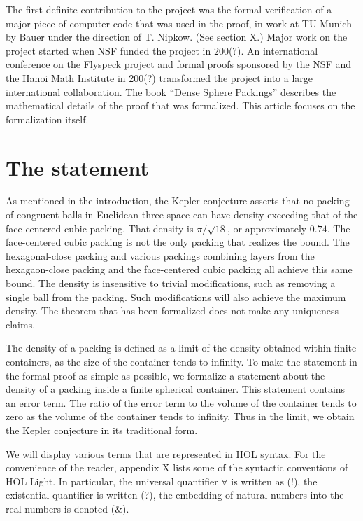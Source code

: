 The first  definite contribution to the project was the formal verification of a major piece of
computer code that was used in the proof, in work at TU Munich by Bauer under the direction of T. Nipkow. (See section X.)
Major work on the project started when NSF funded
the project in 200(?).   An international conference on the Flyspeck project and formal proofs sponsored by the NSF and the
Hanoi Math Institute in 200(?) transformed the project into a large international collaboration.
The book ``Dense Sphere Packings'' describes the mathematical details of the proof that was formalized.  This article
focuses on the formalization itself.



\section{The statement}

As mentioned in the introduction, 
the Kepler conjecture asserts that no packing of congruent balls in Euclidean three-space can have density exceeding
that of the face-centered cubic packing.  That density is $\pi/\sqrt{18}$, or approximately $0.74$.    The face-centered
cubic packing is not the only packing that realizes the bound.   The hexagonal-close packing and various packings
combining layers from the hexagaon-close packing and the face-centered cubic packing all achieve this same bound.
The density is insensitive to trivial modifications, such as removing a single ball from the packing.   Such modifications
will also achieve the maximum density.  The theorem that has been formalized does not make any
uniqueness claims.

The density of a packing is defined as a limit of the density obtained within finite containers, as the size of the container
tends to infinity.  To make the statement in the formal proof as simple as possible, we formalize a statement about the
density of a packing inside a finite spherical container.  This statement contains an error term.  The ratio
of the error term to the volume of the container  tends to zero as the volume of
the container tends to infinity.  Thus in the limit, we obtain the Kepler conjecture in its traditional form.


We will display various terms that are represented in HOL syntax.  For the convenience of the reader, appendix X lists
some of the syntactic conventions of HOL Light.  In particular, the universal quantifier $\forall$ is written as (!), the
existential quantifier is written (?),  the embedding of natural numbers into the real numbers is denoted (\&).




